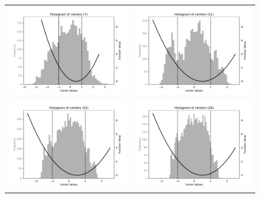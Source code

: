\documentclass[12pt]{report} %
\begin{document}
\begin{figure}
  \hspace*{-2cm}
  \begin{tabular}{cc}
    \includegraphics[width=.6\textwidth, clip=true,trim={.5cm 0 .5cm 0}]{imagenes/experiments/1d/ode/histogram-centers-C7.pdf}  &
    \includegraphics[width=.6\textwidth, clip=true,trim={.5cm 0 .5cm 0}]{imagenes/experiments/1d/ode/histogram-centers-C11.pdf}   \\
    \includegraphics[width=.6\textwidth, clip=true,trim={.5cm 0 .5cm 0}]{imagenes/experiments/1d/ode/histogram-centers-C15.pdf} &
    \includegraphics[width=.6\textwidth, clip=true,trim={.5cm 0 .5cm 0}]{imagenes/experiments/1d/ode/histogram-centers-C20.pdf}   \\

\end{tabular}
\end{figure}
\end{document}
